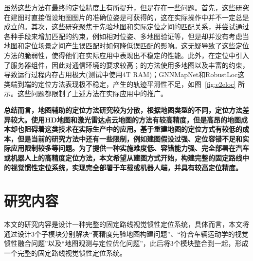 虽然这些方法在最终的定位精度上有所提升，但是存在一些问题。首先，这些研究在建图时直接假设地图图片的准确位姿是可获得的，这在实际操作中并不一定总是成立的。其次，这些研究聚焦于先验地图和实际定位之间的匹配关系，并尝试通过各种手段来增加匹配的约束，例如相对位姿、多地图验证等，但是却并没有考虑当地图和定位场景之间产生误匹配时如何降低误匹配的影响。这无疑导致了这些定位方法的脆弱性，使得他们在实际应用中表现出不稳定的性能。此外，\citet{yang2022real}在定位中引入了服务器组件，因此对通信环境的要求较高；\citet{lin2023visual}的方法使用多地图以及丰富的约束，导致运行过程内存占用极大(测试中使用4T RAM)；GNNMapNet和RobustLoc这类端到端的定位方法表现极不稳定，产生的轨迹平滑性不足，如图~\ref{fig:e2eloc} 所示。这些问题都限制了上述方法在实际应用中的推广。

\textbf{总结而言，地图辅助的定位方法研究较为分散，根据地图类型的不同，定位方法差异较大。使用HD地图和激光雷达点云地图的方法有较高精度，但是高昂的地图成本却也阻碍着这类技术在实际生产中的应用。基于重建地图的定位方式有较低的成本，但是当前的研究方法中还有一些限制，例如建图假设过强、定位容错不足和实际应用限制较多等问题。为了提供一种实施难度低、容错能力强、完全部署在汽车或机器人上的高精度定位方法，本文希望从建图方式开始，构建完整的固定路线中的视觉惯性定位系统，实现完全部署于车载或机器人端，并具有较高定位精度。}






\section{研究内容}

本文的研究内容是设计一种完整的固定路线视觉惯性定位系统，具体而言，本文将通过设计3个子模块分别解决“高精度先验地图构建问题”、“符合车辆运动学的视觉惯性融合问题”以及“地图观测与定位优化问题”，此后将3个模块整合到一起，形成一个完整的固定路线视觉惯性定位系统。

